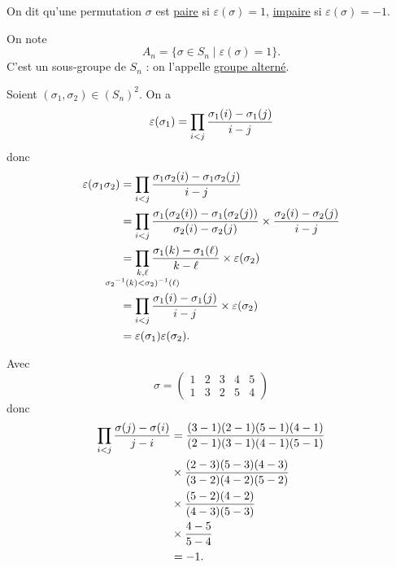 \begin{defn}
	On dit qu'une permutation $\sigma$ est \underline{paire} si $\varepsilon(\sigma) = 1$, \underline{impaire} si $\varepsilon(\sigma) = -1$.
\end{defn}

\begin{prop-defn}
	On note \[
		A_n = \{\sigma \in S_n  \mid \varepsilon(\sigma) = 1\}.
	\]
	C'est un sous-groupe de $S_n$ : on l'appelle \underline{groupe alterné}.
\end{prop-defn}

\begin{prv}
	Soient $(\sigma_1, \sigma_2) \in (S_n)^2$. On a \[
		\varepsilon(\sigma_1) = \prod_{i<j} \frac{\sigma_1(i) - \sigma_1(j)}{i - j}\\
	\] donc
	\begin{align*}
		\varepsilon(\sigma_1\sigma_2) &= \prod_{i<j} \frac{\sigma_1\sigma_2(i) - \sigma_1\sigma_2(j)}{i-j}\\
		&= \prod_{i<j}\frac{\sigma_1(\sigma_2(i)) - \sigma_1(\sigma_2(j))}{\sigma_2(i) - \sigma_2(j)} \times \frac{\sigma_2(i) - \sigma_2(j)}{i-j} \\
		&= \prod_{\mathclap{\substack{k,\ell\\{\sigma_2}^{-1}(k) < {\sigma_2)^{-1}(\ell)}}}}
		\frac{\sigma_1(k) - \sigma_1(\ell)}{k-\ell}\times \varepsilon(\sigma_2)\\
		&= \prod_{i<j}\frac{\sigma_1(i) - \sigma_1(j)}{i-j}\times \varepsilon(\sigma_2) \\
		&= \varepsilon(\sigma_1)\varepsilon(\sigma_2). \\
	\end{align*}
\end{prv}

\begin{exm}
	Avec \[
		\sigma = \begin{pmatrix}
			1&2&3&4&5\\
			1&3&2&5&4
		\end{pmatrix}
	\] donc 
	\begin{align*}
		\prod_{i<j} \frac{\sigma(j) - \sigma(i)}{j - i}
		&= \frac{\cancel{(3-1)}\cancel{(2-1)}\cancel{(5-1)}\cancel{(4-1)}}{\cancel{(2-1)}\cancel{(3-1)}\cancel{(4-1)}\cancel{(5-1)}} \\
		&\times \frac{\cancel{(2-3)}\cancel{(5-3)}\cancel{(4-3)}}{\cancel{(3-2)}\cancel{(4-2)}\cancel{(5-2)}}\\
		&\times \frac{\cancel{(5-2)}\cancel{(4-2)}}{\cancel{(4-3)}\cancel{(5-3)}}\\
		&\times \frac{4-5}{5-4}\\
		&= -1. \\
	\end{align*}
\end{exm}

